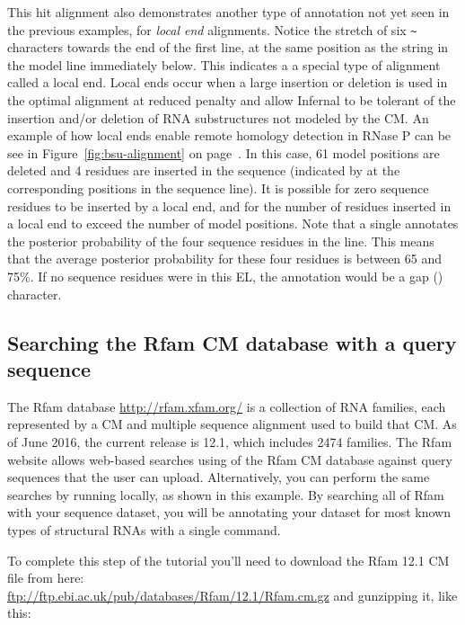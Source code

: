 This hit alignment also demonstrates another type of annotation not
yet seen in the previous examples, for \emph{local end}
alignments. Notice the stretch of six \verb+~+ characters towards the
end of the first  line, at the same position as the string
\otext{*[61]*} in the model line immediately below. This indicates a a
special type of alignment called a local end. Local ends occur when a
large insertion or deletion is used in the optimal alignment at
reduced penalty \citep{KleinEddy03} and allow Infernal to be tolerant
of the insertion and/or deletion of RNA substructures not modeled by
the CM. An example of how local ends enable remote homology detection
in RNase P can be see in Figure~\ref{fig:bsu-alignment} on
page~\pageref{fig:bsu-alignment}. In this case, 61 model positions are
deleted and 4 residues are inserted in the sequence (indicated by
\otext{*[ 4]*} at the corresponding positions in the sequence line).
It is possible for zero sequence residues to be inserted by a local
end, and for the number of residues inserted in a local end to exceed
the number of model positions. Note that a single  annotates
the posterior probability of the four sequence residues in the
 line. This means that the average posterior probability for
these four residues is between 65 and 75\%. If no sequence residues
were in this EL, the  annotation would be a gap ()
character.

\subsection{Searching the Rfam CM database with a query sequence}

The Rfam database \url{http://rfam.xfam.org/} is a collection
of RNA families, each represented by a CM and multiple sequence
alignment used to build that CM. As of June 2016, the current release
is 12.1, which includes 2474 families. The Rfam website allows
web-based searches using  of the Rfam CM database against
query sequences that the user can upload. Alternatively, you can perform
the same searches by running  locally, as shown in this
example. By searching all of Rfam with your sequence dataset, you will
be annotating your dataset for most known types of structural RNAs
with a single command.

To complete this step of the tutorial you'll need to download the Rfam
12.1 CM file from here: \\
\url{ftp://ftp.ebi.ac.uk/pub/databases/Rfam/12.1/Rfam.cm.gz} 
and gunzipping it, like this: 

